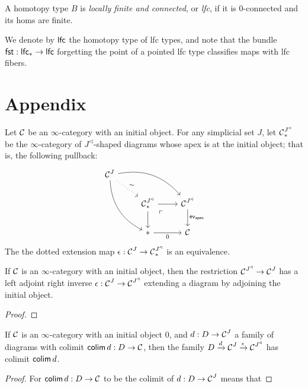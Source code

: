 \begin{defn}
A homotopy type $B$ is \emph{locally finite and connected}, or \emph{lfc}, if it
is $0$-connected and its homs are finite.

We denote by $\mathsf{{lfc}}$ the homotopy type of lfc types, and note that the
bundle $\operatorname{\mathsf{{fst}}} : \mathsf{{lfc}}_{\ast} \to \mathsf{{lfc}}$ forgetting the point of a
pointed lfc type classifies maps with lfc fibers.
\end{defn}



\section{Appendix}

\begin{lem}\label{lem:cone.initial.equivalence}
Let $\operatorname{\mathcal{C}}$ be an $\infty$-category with an initial object. For any simplicial set
$J$, let $\operatorname{\mathcal{C}}^{J^{\triangleleft}}_{\ast}$ be the $\infty$-category of
  $J^{\triangleleft}$-shaped diagrams whose apex is at the initial object; that
  is, the following pullback:
  \[
    \begin{tikzcd}
      \Ca^{J} \arrow[drr, bend left] \arrow[ddr, bend right] \arrow[dr,
      dotted, "\sim"] & & \\
      & \Ca^{J^{\triangleleft}}_{\ast} \arrow[d] \arrow[r] \arrow[dr, phantom,
      "\ulcorner" very near start] & \Ca^{J^{\triangleleft}} \arrow[d,
      "\term{ev}_{\term{apex}}"] \\
      & \ast \arrow[r, "0"'] & \Ca
    \end{tikzcd}
  \]
The the dotted extension map  $\epsilon : \operatorname{\mathcal{C}}^{J} \to \operatorname{\mathcal{C}}^{J^{\triangleleft}}_{\ast}$ is an equivalence.
\end{lem}

\begin{lem}\label{lem:kan.extending.cone.adds.initial}
If $\operatorname{\mathcal{C}}$ is an $\infty$-category with an initial object, then the restriction
$\operatorname{\mathcal{C}}^{J^{\triangleleft}} \to \operatorname{\mathcal{C}}^{J}$ has a left adjoint right inverse $\epsilon
: \operatorname{\mathcal{C}}^J \to \operatorname{\mathcal{C}}^{J^{\triangleleft}}$ extending a diagram by adjoining the
initial object. 
\end{lem}
\begin{proof}

\end{proof}


\begin{lem}\label{lem:extending.diagram.with.initial.object.has.same.colimit}
If $\operatorname{\mathcal{C}}$ is an $\infty$-category with an initial object $0$, and $d : D \to
\operatorname{\mathcal{C}}^J$ a family of diagrams with colimit $\operatorname{\mathsf{colim}} d : D \to \operatorname{\mathcal{C}}$, then the family
$D \xrightarrow{d} \operatorname{\mathcal{C}}^J \xrightarrow{\epsilon} \operatorname{\mathcal{C}}^{J^{\triangleleft}}$ has colimit $\operatorname{\mathsf{colim}} d$.
\end{lem}
\begin{proof}
For $\operatorname{\mathsf{colim}} d : D \to \operatorname{\mathcal{C}}$ to be the colimit of $d : D \to \operatorname{\mathcal{C}}^J$ means that 
\end{proof}


